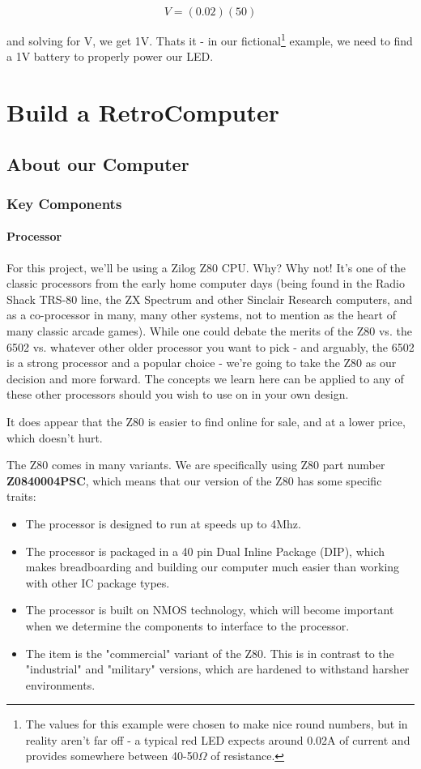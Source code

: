 \documentclass[10pt]{report}
\begin{document}
\begin{equation}
V = (0.02)(50)
\end{equation}

and solving for V, we get 1V. Thats it - in our fictional\footnote{The values for this example were chosen to make nice round numbers, but in reality aren't far off - a typical red LED expects around 0.02A of current and provides somewhere between 40-50$\Omega$ of resistance.} example, we need to find a 1V battery to properly power our LED.

\part{Build a RetroComputer}
\chapter{About our Computer}
\section{Key Components}

\subsection{Processor}
For this project, we'll be using a Zilog Z80 CPU. Why? Why not! It's one of the classic processors from the early home computer days (being found in the Radio Shack TRS-80 line, the ZX Spectrum and other Sinclair Research computers, and as a co-processor in many, many other systems, not to mention as the heart of many classic arcade games). While one could debate the merits of the Z80 vs. the 6502 vs. whatever other older processor you want to pick - and arguably, the 6502 is a strong processor and a popular choice - we're going to take the Z80 as our decision and more forward. The concepts we learn here can be applied to any of these other processors should you wish to use on in your own design.

It does appear that the Z80 is easier to find online for sale, and at a lower price, which doesn't hurt. 

The Z80 comes in many variants. We are specifically using Z80 part number \textbf{Z0840004PSC}, which means that our version of the Z80 has some specific traits:

\begin{itemize}
\item The processor is designed to run at speeds up to 4Mhz.
\item The processor is packaged in a 40 pin Dual Inline Package (DIP), which makes breadboarding and building our computer much easier than working with other IC package types.
\item The processor is built on NMOS technology, which will become important when we determine the components to interface to the processor.
\item The item is the "commercial" variant of the Z80. This is in contrast to the "industrial" and "military" versions, which are hardened to withstand harsher environments.
\end{itemize}
\end{document}
